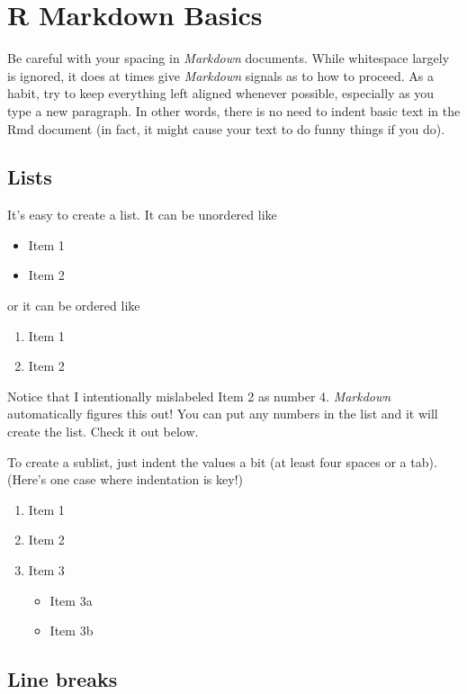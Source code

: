 \documentclass[12pt, twoside]{amherstthesis}
\providecommand{\tightlist}{%
  \setlength{\itemsep}{0pt}\setlength{\parskip}{0pt}}
\theoremstyle{definition}
\theoremstyle{definition}
\theoremstyle{definition}
\theoremstyle{remark}
\begin{document}
\hypertarget{rmd-basics}{%
\chapter{R Markdown Basics}\label{rmd-basics}}

Be careful with your spacing in \emph{Markdown} documents. While whitespace largely is ignored, it does at times give \emph{Markdown} signals as to how to proceed. As a habit, try to keep everything left aligned whenever possible, especially as you type a new paragraph. In other words, there is no need to indent basic text in the Rmd document (in fact, it might cause your text to do funny things if you do).

\hypertarget{lists}{%
\section{Lists}\label{lists}}

It's easy to create a list. It can be unordered like
\begin{itemize}
\tightlist
\item
  Item 1
\item
  Item 2
\end{itemize}
or it can be ordered like
\begin{enumerate}
\def\labelenumi{\arabic{enumi}.}
\tightlist
\item
  Item 1
\item
  Item 2
\end{enumerate}
Notice that I intentionally mislabeled Item 2 as number 4. \emph{Markdown} automatically figures this out! You can put any numbers in the list and it will create the list. Check it out below.

To create a sublist, just indent the values a bit (at least four spaces or a tab). (Here's one case where indentation is key!)
\begin{enumerate}
\def\labelenumi{\arabic{enumi}.}
\tightlist
\item
  Item 1
\item
  Item 2
\item
  Item 3
  \begin{itemize}
  \tightlist
  \item
    Item 3a
  \item
    Item 3b
  \end{itemize}
\end{enumerate}
\hypertarget{line-breaks}{%
\section{Line breaks}\label{line-breaks}}
\end{document}
